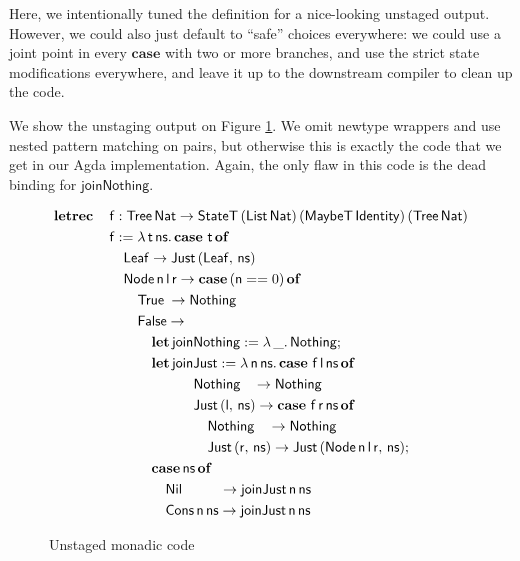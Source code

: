 \documentclass[acmsmall,screen]{acmart}
\newcommand{\msf}[1]{{\mathsf{#1}}}
\newcommand{\mbf}[1]{{\mathbf{#1}}}
\newcommand{\ind}{\hspace{1em}}
\newcommand{\lam}{\lambda\,}
\newcommand{\letrec}{\mbf{letrec}\,}
\newcommand{\of}{\mbf{of}\,}
\newcommand{\letdef}{\mbf{let\,}}
\newcommand{\vn}{\mathsf{n}}
\newcommand{\vf}{\mathsf{f}}
\newcommand{\vt}{\mathsf{t}}
\newcommand{\vr}{\mathsf{r}}
\newcommand{\vl}{\mathsf{l}}
\newcommand{\vns}{\mathsf{ns}}
\newcommand{\List}{\msf{List}}
\newcommand{\Tree}{\msf{Tree}}
\newcommand{\Node}{\msf{Node}}
\newcommand{\Leaf}{\msf{Leaf}}
\newcommand{\Nil}{\msf{Nil}}
\newcommand{\Cons}{\msf{Cons}}
\newcommand{\case}{\mbf{case\,}}
\newcommand{\True}{\msf{True}}
\newcommand{\False}{\msf{False}}
\newcommand{\Nat}{\msf{Nat}}
\newcommand{\MaybeT}{\msf{MaybeT}}
\newcommand{\Nothing}{\msf{Nothing}}
\newcommand{\Just}{\msf{Just}}
\theoremstyle{remark}
\newcommand{\StateT}{\msf{StateT}}
\newcommand{\Identity}{\msf{Identity}}
\begin{document}
Here, we intentionally tuned the definition for a nice-looking unstaged output.
However, we could also just default to ``safe'' choices everywhere: we could use
a joint point in every $\mbf{case}$ with two or more branches, and use the
strict state modifications everywhere, and leave it up to the downstream compiler
to clean up the code.

We show the unstaging output on Figure \ref{fig:codeout}. We omit newtype
wrappers and use nested pattern matching on pairs, but otherwise this is exactly
the code that we get in our Agda implementation. Again, the only flaw in this
code is the dead binding for $\msf{joinNothing}$.
\begin{figure}\label{fig:codeout}
\begin{alignat*}{4}
  &  \letrec &&\vf : \Tree\,\Nat \to \StateT\,(\List\,\Nat)\,(\MaybeT\,\Identity)\,(\Tree\,\Nat) \\
  &          &&\vf := \lam \vt\,\vns.\, \case\,\vt\,\of\\
  &          &&\ind \Leaf \to \Just\,(\Leaf,\,\vns) \\
  &          &&\ind \Node\,\vn\,\vl\,\vr \to \case (\vn == 0)\,\of\\
  &          &&\ind \ind \True \hspace{0.25em}\to \Nothing \\
  &          &&\ind \ind \False \to \\
  &          &&\ind \ind \ind \letdef \msf{joinNothing} := \lam \_.\,\Nothing;\\
  &          &&\ind \ind \ind \letdef \msf{joinJust} := \lam \vn\,\vns.\,\case\,\vf\,\vl\,\vns\,\of\\
  &          &&\ind \ind \ind \ind \ind \ind \Nothing\hspace{0.9em} \to \Nothing\\
  &          &&\ind \ind \ind \ind \ind \ind \Just\,(\vl,\,\vns) \to \case\,\vf\,\vr\,\vns\,\of\\
  &          &&\ind \ind \ind \ind \ind \ind \ind \Nothing\hspace{.95em} \to \Nothing\\
  &          &&\ind \ind \ind \ind \ind \ind \ind \Just\,(\vr,\,\vns) \to \Just\,(\Node\,\vn\,\vl\,\vr,\,\vns);\\
  &          &&\ind \ind \ind \case \vns\,\of\\
  &          &&\ind \ind \ind \ind \Nil \hspace{2.65em}\to \msf{joinJust}\,\vn\,\vns\\
  &          &&\ind \ind \ind \ind \Cons\,\vn\,\vns \to \msf{joinJust}\,\vn\,\vns
\end{alignat*}
\caption{Unstaged monadic code}
\label{fig:codeout}
\end{figure}
\end{document}
